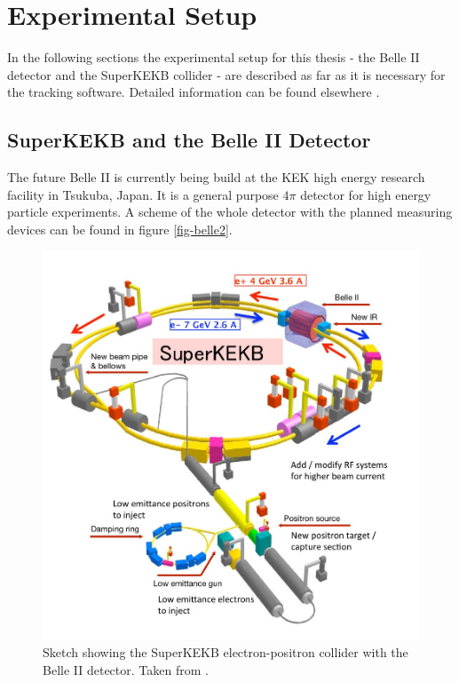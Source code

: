 \chapter{Experimental Setup} \label{chapter-ex}
In the following sections the experimental setup for this thesis - the Belle II detector and the SuperKEKB collider - are described as far as it is necessary for the tracking software. Detailed information can be found elsewhere \cite{tdr}.


\section{SuperKEKB and the Belle II Detector}

The future Belle II is currently being build at the KEK high energy research facility in Tsukuba, Japan. It is a general purpose $4\pi$ detector for high energy particle experiments. A scheme of the whole detector with the planned measuring devices can be found in figure \ref{fig-belle2}.

\begin{figure}
 \centering
 \includegraphics[height=0.4\textheight]{figures/experimental_setup/superkekb.jpg}
 \caption{Sketch showing the SuperKEKB electron-positron collider with the Belle II detector. Taken from \cite{DesyWebseite}.}
 \label{fig-superkekb}
\end{figure}


